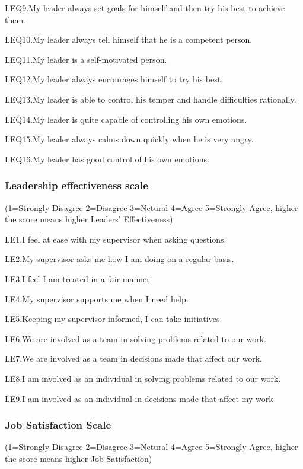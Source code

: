 \documentclass[
  man,
  longtable,
  nolmodern,
  notxfonts,
  notimes,
  colorlinks=true,linkcolor=blue,citecolor=blue,urlcolor=blue]{apa7}
\begin{document}
LEQ9.My leader always set goals for himself and then try his best to
achieve them.

LEQ10.My leader always tell himself that he is a competent person.

LEQ11.My leader is a self-motivated person.

LEQ12.My leader always encourages himself to try his best.

LEQ13.My leader is able to control his temper and handle difficulties
rationally.

LEQ14.My leader is quite capable of controlling his own emotions.

LEQ15.My leader always calms down quickly when he is very angry.

LEQ16.My leader has good control of his own emotions.

\subsubsection{Leadership effectiveness
scale}\label{leadership-effectiveness-scale-1}

(1=Strongly Disagree 2=Disagree 3=Netural 4=Agree 5=Strongly Agree,
higher the score means higher Leaders' Effectiveness)

LE1.I feel at ease with my supervisor when asking questions.

LE2.My supervisor asks me how I am doing on a regular basis.

LE3.I feel I am treated in a fair manner.

LE4.My supervisor supports me when I need help.

LE5.Keeping my supervisor informed, I can take initiatives.

LE6.We are involved as a team in solving problems related to our work.

LE7.We are involved as a team in decisions made that affect our work.

LE8.I am involved as an individual in solving problems related to our
work.

LE9.I am involved as an individual in decisions made that affect my work

\subsubsection{Job Satisfaction Scale}\label{job-satisfaction-scale-1}

(1=Strongly Disagree 2=Disagree 3=Netural 4=Agree 5=Strongly Agree,
higher the score means higher Job Satisfaction)
\end{document}
